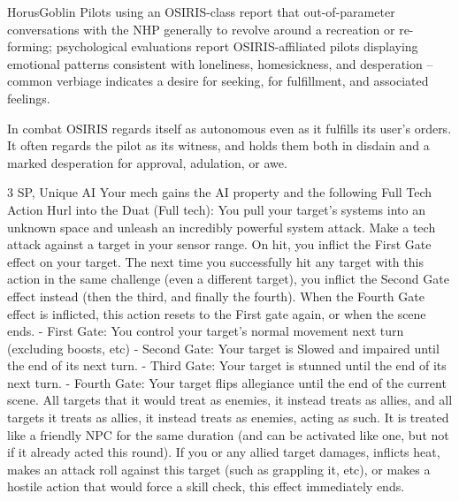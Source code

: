 \begin{mech}{Horus}{Goblin}
Pilots using an OSIRIS-class report that out-of-parameter conversations with the NHP generally to revolve around a recreation or re-forming; psychological evaluations report OSIRIS-affiliated pilots displaying emotional patterns consistent with loneliness, homesickness, and desperation -- common verbiage indicates a desire for seeking, for fulfillment, and associated feelings.

In combat OSIRIS regards itself as autonomous even as it fulfills its user’s orders. It often regards the pilot as its witness, and holds them both in disdain and a marked desperation for approval, adulation, or awe.


3 SP, Unique
AI
Your mech gains the AI property and the following Full Tech Action
Hurl into the Duat (Full tech): You pull your target’s systems into an unknown space and unleash an incredibly powerful system attack. Make a tech attack against a target in your sensor range. On hit, you inflict the First Gate effect on your target. The next time you successfully hit any target with this action in the same challenge (even a different target), you inflict the Second Gate effect instead (then the third, and finally the fourth). When the Fourth Gate effect is inflicted, this action resets to the First gate again, or when the scene ends.
	- First Gate: You control your target’s normal movement next turn (excluding boosts, etc)
	- Second Gate: Your target is Slowed and impaired until the end of its next turn.
	- Third Gate: Your target is stunned until the end of its next turn.
	- Fourth Gate: Your target flips allegiance until the end of the current scene. All targets that it would treat as enemies, it instead treats as allies, and all targets it treats as allies, it instead treats as enemies, acting as such. It is treated like a friendly NPC for the same duration (and can be activated like one, but not if it already acted this round). If you or any allied target damages, inflicts heat, makes an attack roll against this target (such as grappling it, etc), or makes a hostile action that would force a skill check, this effect immediately ends.


\end{mech}
